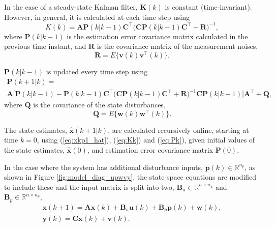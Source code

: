In the case of a steady-state Kalman filter, $\mathbf{K}(k)$ is constant (time-invariant). However, in general, it is calculated at each time step using
\begin{equation} \label{eq:Kk}
	K(k) = \mathbf{A}\mathbf{P}(k|k-1)\mathbf{C}^\intercal \big(\mathbf{C}\mathbf{P}(k|k-1)\mathbf{C}^\intercal + \mathbf{R}\big)^{-1},
\end{equation}
where $\mathbf{P}(k|k-1)$ is the estimation error covariance matrix calculated in the previous time instant, and $\mathbf{R}$ is the covariance matrix of the measurement noises,
\begin{equation} \label{eq:R}
	\mathbf{R} = E\{ \mathbf{v}(k) \mathbf{v}^\intercal(k) \}.
\end{equation}

$\mathbf{P}(k|k-1)$ is updated every time step using
\begin{multline} \label{eq:Pk}
	\mathbf{P}(k+1|k) = \\ \mathbf{A}\big[\mathbf{P}(k|k-1)
	- \mathbf{P}(k|k-1)\mathbf{C}^\intercal\big(\mathbf{C}\mathbf{P}(k|k-1)\mathbf{C}^\intercal + 
	\mathbf{R}\big)^{-1}\mathbf{C}\mathbf{P}(k|k-1) \big]\mathbf{A}^\intercal + \mathbf{Q},
\end{multline}
where $\mathbf{Q}$ is the covariance of the state disturbances,
\begin{equation} \label{eq:Q}
	\mathbf{Q} = E\{ \mathbf{w}(k) \mathbf{w}^\intercal(k) \}.
\end{equation}

The state estimates, $\mathbf{\hat{x}}(k+1|k)$, are calculated recursively online, starting at time $k=0$, using (\ref{eq:xkp1_hat}), (\ref{eq:Kk}) and (\ref{eq:Pk}), given initial values of the state estimates, $\mathbf{\hat{x}}(0)$, and estimation error covariance matrix $\mathbf{P}(0)$.

In the case where the system has additional disturbance inputs, $\mathbf{p}(k) \in \mathbb{R}^{n_p}$, as shown in Figure \ref{fig:model_diag_upwvy}, the state-space equations are modified to include these and the input matrix is split into two, $\mathbf{B}_u \in \mathbb{R}^{n \times n_u}$ and $\mathbf{B}_p \in \mathbb{R}^{n \times n_p}$,
\begin{equation} \label{eq:ss_rep_upwy}
	\begin{aligned}
		\mathbf{x}(k+1) = \mathbf{A} \mathbf{x}(k) + \mathbf{B}_u \mathbf{u}(k) + \mathbf{B}_p \mathbf{p}(k) + \mathbf{w}(k), \\
		\mathbf{y}(k) = \mathbf{C} \mathbf{x}(k) + \mathbf{v}(k).
	\end{aligned}
\end{equation}

